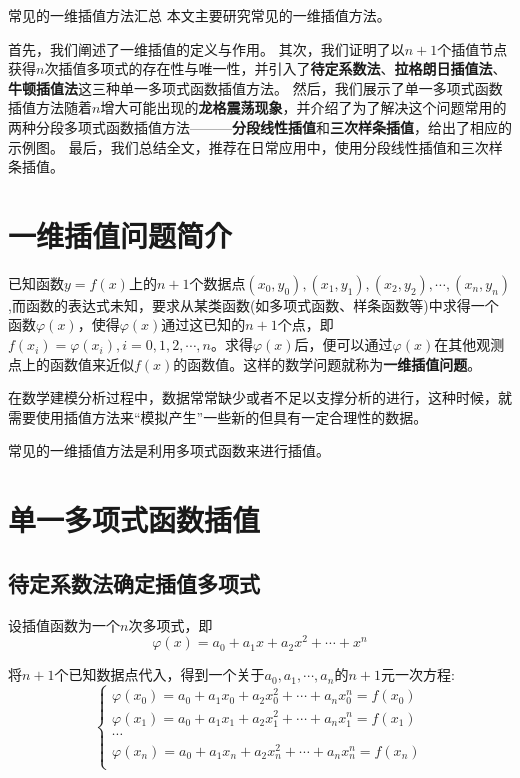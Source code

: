 \documentclass[withoutpreface]{cumcmthesis}
\begin{document}
\begin{abstractpage}{常见的一维插值方法汇总}
    本文主要研究常见的一维插值方法。

    首先，我们阐述了一维插值的定义与作用。
    其次，我们证明了以$n+1$个插值节点获得$n$次插值多项式的存在性与唯一性，并引入了\textbf{待定系数法}、\textbf{拉格朗日插值法}、\textbf{牛顿插值法}这三种单一多项式函数插值方法。
    然后，我们展示了单一多项式函数插值方法随着$n$增大可能出现的\textbf{龙格震荡现象}，并介绍了为了解决这个问题常用的两种分段多项式函数插值方法———\textbf{分段线性插值}和\textbf{三次样条插值}，给出了相应的示例图。
    最后，我们总结全文，推荐在日常应用中，使用分段线性插值和三次样条插值。
\end{abstractpage}

\tocpage
\section{一维插值问题简介}

已知函数$y=f(x)$上的$n+1$个数据点$(x_0,y_0),(x_1,y_1),(x_2,y_2),\cdots,(x_n,y_n)$,而函数的表达式未知，要求从某类函数(如多项式函数、样条函数等)中求得一个函数$\varphi(x)$，使得$\varphi(x)$通过这已知的$n+1$个点，即$f(x_i)=\varphi(x_i),i=0,1,2,\cdots,n$。求得$\varphi(x)$后，便可以通过$\varphi(x)$在其他观测点上的函数值来近似$f(x)$的函数值。这样的数学问题就称为\textbf{一维插值问题}。

在数学建模分析过程中，数据常常缺少或者不足以支撑分析的进行，这种时候，就需要使用插值方法来“模拟产生”一些新的但具有一定合理性的数据。

常见的一维插值方法是利用多项式函数来进行插值。

\section{单一多项式函数插值}
\subsection{待定系数法确定插值多项式}

设插值函数为一个$n$次多项式，即
\begin{equation}\label{1}
    \varphi(x)=a_0+a_1x+a_2x^2+\cdots+x^n
\end{equation}

将$n+1$个已知数据点代入，得到一个关于$a_0,a_1,\cdots,a_n$的$n+1$元一次方程:
\begin{equation}\label{2}
    \begin{cases}
        \varphi(x_0) = a_0+a_1x_0+a_2x_0^2+\cdots+a_nx_0^n = f(x_0) \\
        \varphi(x_1) = a_0+a_1x_1+a_2x_1^2+\cdots+a_nx_1^n = f(x_1) \\
        \cdots                                                      \\
        \varphi(x_n) = a_0+a_1x_n+a_2x_n^2+\cdots+a_nx_n^n = f(x_n) \\
    \end{cases}
\end{equation}
\end{document}
